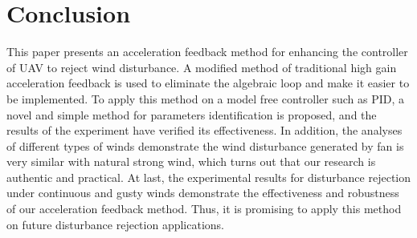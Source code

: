 \documentclass[letterpaper, 10 pt, conference]{ieeeconf}  %
\begin{document}
\section{Conclusion}

This paper presents an acceleration feedback method for enhancing the controller of UAV to reject wind disturbance.
A modified method of traditional high gain acceleration feedback is used to eliminate the algebraic loop and make it easier to be implemented.
To apply this method on a model free controller such as PID, a novel and simple method for parameters identification is proposed, and the results of the experiment have verified its effectiveness.
In addition, the analyses of different types of winds demonstrate the wind disturbance generated by fan is very similar with natural strong wind, which turns out that our research is authentic and practical.
At last, the experimental results for disturbance rejection under continuous and gusty winds demonstrate the effectiveness and robustness of our acceleration feedback method.
Thus, it is promising to apply this method on future disturbance rejection applications.

\addtolength{\textheight}{-12cm}   %




\end{document}
